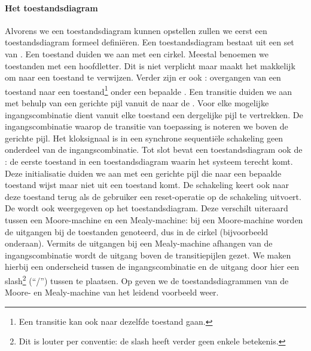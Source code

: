 \paragraph{Het toestandsdiagram}
Alvorens we een toestandsdiagram kunnen opstellen zullen we eerst een toestandsdiagram formeel defini\"eren. Een toestandsdiagram bestaat uit een set van . Een toestand duiden we aan met een cirkel. Meestal benoemen we toestanden met een hoofdletter. Dit is niet verplicht maar maakt het makkelijk om naar een toestand te verwijzen. Verder zijn er ook : overgangen van een toestand naar een toestand\footnote{Een transitie kan ook naar dezelfde toestand gaan.} onder een bepaalde . Een transitie duiden we aan met behulp van een gerichte pijl vanuit de  naar de . Voor elke mogelijke ingangscombinatie dient vanuit elke toestand een dergelijke pijl te vertrekken. De ingangscombinatie waarop de transitie van toepassing is noteren we boven de gerichte pijl. Het kloksignaal is in een synchrone sequenti\"ele schakeling geen onderdeel van de ingangscombinatie. Tot slot bevat een toestandsdiagram ook de : de eerste toestand in een toestandsdiagram waarin het systeem terecht komt. Deze initialisatie duiden we aan met een gerichte pijl die naar een bepaalde toestand wijst maar niet uit een toestand komt. De schakeling keert ook naar deze toestand terug als de gebruiker een reset-operatie op de schakeling uitvoert. De  wordt ook weergegeven op het toestandsdiagram. Deze verschilt uiteraard tussen een Moore-machine en een Mealy-machine: bij een Moore-machine worden de uitgangen bij de toestanden genoteerd, dus in de cirkel (bijvoorbeeld onderaan). Vermits de uitgangen bij een Mealy-machine afhangen van de ingangscombinatie wordt de uitgang boven de transitiepijlen gezet. We maken hierbij een onderscheid tussen de ingangscombinatie en de uitgang door hier een slash\footnote{Dit is louter per conventie: de slash heeft verder geen enkele betekenis.} (``/'') tussen te plaatsen. Op  geven we de toestandsdiagrammen van de Moore- en Mealy-machine van het leidend voorbeeld weer.

